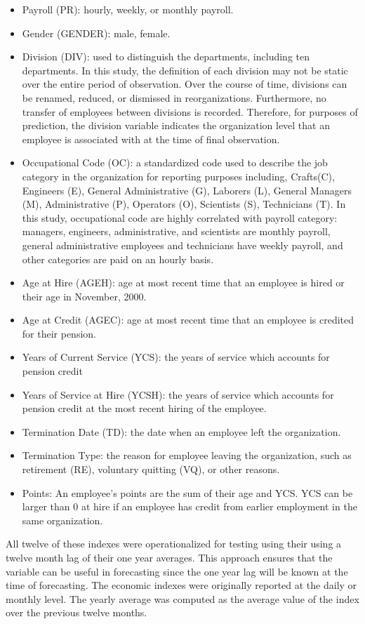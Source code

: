 \begin{itemize}
	\item Payroll (PR): hourly, weekly, or monthly payroll.
	\item Gender (GENDER): male, female.
	\item Division (DIV): used to distinguish the departments, including ten departments. In this study, the definition of each division may not be static over the entire period of observation. Over the course of time, divisions can be renamed, reduced, or dismissed in reorganizations. Furthermore, no transfer of employees between divisions is recorded.  Therefore, for purposes of prediction, the division variable indicates the organization level that an employee is associated with at the time of final observation.
	\item Occupational Code (OC): a standardized code used to describe the job category in the organization for reporting purposes including, Crafts(C), Engineers (E), General Administrative (G), Laborers (L), General Managers (M),  Administrative (P),  Operators (O), Scientists (S), Technicians (T). In this study, occupational code are highly correlated with payroll category: managers, engineers, administrative, and scientists are monthly payroll, general administrative employees and technicians have weekly payroll, and other categories are paid on an hourly basis.
	\item Age at Hire (AGEH): age at most recent time that an employee is hired or their age in November, 2000.
	\item Age at Credit (AGEC): age at most recent time that an employee is credited for their pension.
	\item Years of Current Service (YCS): the years of service which accounts for pension credit
	\item Years of Service at Hire (YCSH): the years of service which accounts for pension credit at the most recent hiring of the employee.
	\item Termination Date (TD): the date when an employee left the organization.
	\item Termination Type: the reason for employee leaving the organization, such as retirement (RE),  voluntary quitting (VQ), or other reasons.
	\item Points: An employee's points are the sum of their age and YCS.  YCS can be larger than 0 at hire if an employee has credit from earlier employment in the same organization.
\end{itemize}
All twelve of these indexes were operationalized for testing using their using a twelve month lag of their one year averages.  This approach ensures that the variable can be useful in forecasting since the one year lag will be known at the time of forecasting. The economic indexes were originally reported at the daily or monthly level. The yearly average was computed as the average value of the index over the previous twelve months.

